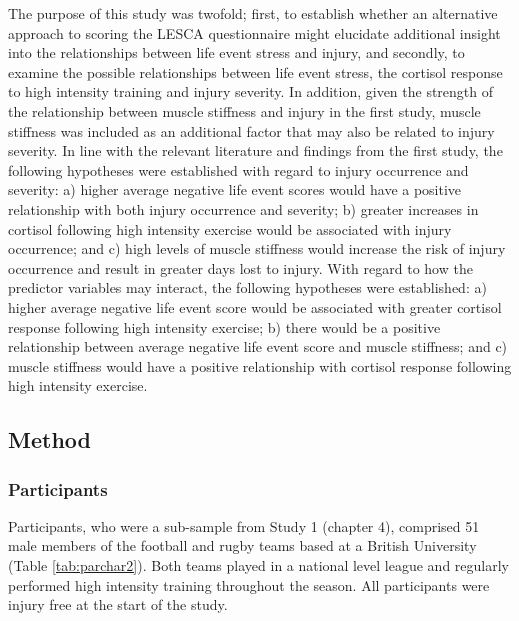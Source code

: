 \documentclass[man,floatsintext]{apa6}
\begin{document}
The purpose of this study was twofold; first, to establish whether an alternative approach to scoring the LESCA questionnaire might elucidate additional insight into the relationships between life event stress and injury, and secondly, to examine the possible relationships between life event stress, the cortisol response to high intensity training and injury severity.
In addition, given the strength of the relationship between muscle stiffness and injury in the first study, muscle stiffness was included as an additional factor that may also be related to injury severity.
In line with the relevant literature and findings from the first study, the following hypotheses were established with regard to injury occurrence and severity:
a) higher average negative life event scores would have a positive relationship with both injury occurrence and severity;
b) greater increases in cortisol following high intensity exercise would be associated with injury occurrence; and
c) high levels of muscle stiffness would increase the risk of injury occurrence and result in greater days lost to injury.
With regard to how the predictor variables may interact, the following hypotheses were established:
a) higher average negative life event score would be associated with greater cortisol response following high intensity exercise;
b) there would be a positive relationship between average negative life event score and muscle stiffness; and
c) muscle stiffness would have a positive relationship with cortisol response following high intensity exercise.

\hypertarget{method-1}{%
\subsection{Method}\label{method-1}}

\hypertarget{participants-2}{%
\subsubsection{Participants}\label{participants-2}}

Participants, who were a sub-sample from Study 1 (chapter 4), comprised 51 male members of the football and rugby teams based at a British University (Table \ref{tab:parchar2}). Both teams played in a national level league and regularly performed high intensity training throughout the season.
All participants were injury free at the start of the study.
\end{document}
